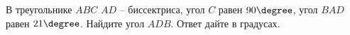 \begin{ex}
	\begin{condition}
		 В треугольнике \( ABC \) \( AD \) – биссектриса, угол \( C \) равен \( 90\degree \), угол \( BAD \) равен \( 21\degree \). Найдите угол \( ADB \). Ответ дайте в градусах.
	\end{condition}
\end{ex}